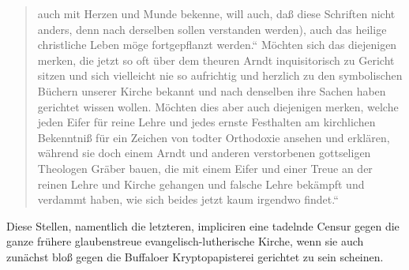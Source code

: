 \begin{quote}
auch mit Herzen und Munde bekenne, will auch, daß diese Schriften nicht anders, denn nach derselben
sollen verstanden werden), auch das heilige christliche Leben möge fortgepflanzt werden.“ Möchten sich
das diejenigen merken, die jetzt so oft über dem theuren Arndt inquisitorisch zu Gericht sitzen und sich
vielleicht nie so aufrichtig und herzlich zu den symbolischen Büchern unserer Kirche bekannt und nach
denselben ihre Sachen haben gerichtet wissen wollen. Möchten dies aber auch diejenigen merken, welche
jeden Eifer für reine Lehre und jedes ernste Festhalten am kirchlichen Bekenntniß für ein Zeichen
von todter Orthodoxie ansehen und erklären, während sie doch einem Arndt und anderen verstorbenen
gottseligen Theologen Gräber bauen, die mit einem Eifer und einer Treue an der reinen Lehre und Kirche
gehangen und falsche Lehre bekämpft und verdammt haben, wie sich beides jetzt kaum irgendwo findet.“

\end{quote}

Diese Stellen, namentlich die letzteren, impliciren eine tadelnde Censur gegen die ganze frühere
glaubenstreue evangelisch-lutherische Kirche, wenn sie auch zunächst bloß gegen die Buffaloer
Kryptopapisterei gerichtet zu sein scheinen.

